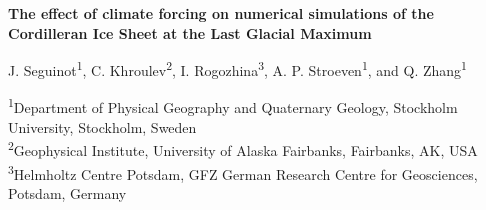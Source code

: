 \documentclass[12pt]{article}
\begin{document}
\textbf{The effect of climate forcing on numerical simulations of the Cordilleran Ice Sheet at the Last Glacial Maximum}

J. Seguinot\textsuperscript{1},
C. Khroulev\textsuperscript{2},
I. Rogozhina\textsuperscript{3},
A. P. Stroeven\textsuperscript{1},
and Q. Zhang\textsuperscript{1}

\textsuperscript{1}Department of Physical Geography and Quaternary Geology, Stockholm University, Stockholm, Sweden \\
\textsuperscript{2}Geophysical Institute, University of Alaska Fairbanks, Fairbanks, AK, USA \\
\textsuperscript{3}Helmholtz Centre Potsdam, GFZ German Research Centre for Geosciences, Potsdam, Germany


\end{document}
